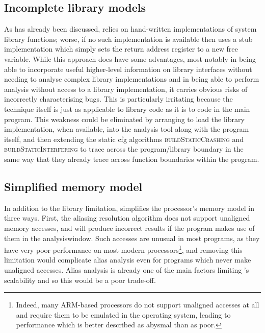 \subsection{Incomplete library models}
As has already been discussed, {\implementation} relies on
hand-written {\StateMachine} implementations of system library
functions; worse, if no such implementation is available then
{\implementation} uses a stub implementation which simply sets the
return address register to a new free variable.  While this approach
does have some advantages, most notably in being able to incorporate
useful higher-level information on library interfaces without needing
to analyse complex library implementations and in being able to
perform analysis without access to a library implementation, it
carries obvious risks of incorrectly characterising bugs.  This is
particularly irritating because the {\technique} technique itself is
just as applicable to library code as it is to code in the main
program.  This weakness could be eliminated by arranging to load the
library implementation, when available, into the {\implementation}
analysis tool along with the program itself, and then extending the
static \gls{cfg} algorithms \textsc{buildStaticCrashing} and
\textsc{buildStaticInterfering} to trace across the program/library
boundary in the same way that they already trace across function
boundaries within the program.

\subsection{Simplified memory model}
\label{sect:derive:simpl_mem_model}

In addition to the library limitation, {\implementation} simplifies
the processor's memory model in three ways.  First, the aliasing
resolution algorithm does not support unaligned memory accesses, and
will produce incorrect results if the program makes use of them in the
\gls{analysiswindow}.  Such accesses are unusual in most programs, as
they have very poor performance on most modern
processors\footnote{Indeed, many ARM-based processors do not support
  unaligned accesses at all and require them to be emulated in the
  operating system, leading to performance which is better described
  as abysmal than as poor.}, and removing this limitation would
complicate alias analysis even for programs which never make unaligned
accesses.  Alias analysis is already one of the main factors limiting
{\implementation}'s scalability and so this would be a poor trade-off.

